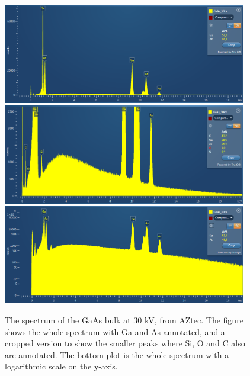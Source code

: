 \begin{figure}[p]
    \centering
    \includegraphics[width=0.95\textwidth]{figures/GaAs_30kV_SEM_lin.PNG}
    \\[2em]
    \includegraphics[width=0.95\textwidth]{figures/GaAs_30kV_SEM_lin_scaled.PNG}
    \\[2em]
    \includegraphics[width=0.95\textwidth]{figures/GaAs_30kV_SEM_log.PNG}
    \caption{
        The spectrum of the GaAs bulk at 30 kV, from AZtec.
        The figure shows the whole spectrum with Ga and As annotated, and a cropped version to show the smaller peaks where Si, O and C also are annotated.
        The bottom plot is the whole spectrum with a logarithmic scale on the y-axis.
    }
    \label{fig:GaAs30kV_AZ}
\end{figure}


